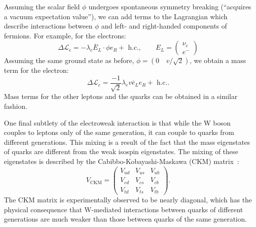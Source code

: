 Assuming the scalar field $\phi$ undergoes spontaneous symmetry breaking (``acquires a vacuum expectation value''), we can add terms to the Lagrangian which describe interactions between $\phi$ and left- and right-handed components of fermions.
For example, for the electrons:
\begin{equation}
\Delta \mathcal L_e = - \lambda_e \bar{E}_L \cdot \phi e_R + \text{ h.c.}, \qquad E_L = \begin{pmatrix} \nu_e \\ e^- \end{pmatrix} 
\end{equation}
Assuming the same ground state as before, $\phi = (0 \quad v/\sqrt{2})$, we obtain a mass term for the electron:
\begin{equation}
    \Delta \mathcal L_e = \frac{-1}{\sqrt{2}} \lambda_e v \bar{e}_L e_R + \text{ h.c.}.
\end{equation}
Mass terms for the other leptons and the quarks can be obtained in a similar fashion.

One final subtlety of the electroweak interaction is that while the W boson couples to leptons only of the same generation, it can couple to quarks from different generations.
This mixing is a result of the fact that the mass eigenstates of quarks are different from the weak isospin eigenstates.
The mixing of these eigenstates is described by the Cabibbo-Kobayashi-Maskawa (CKM) matrix~\cite{Cabibbo:1963yz,Kobayashi:1973fv}:
\begin{equation}
V_{\text{CKM}} = \begin{pmatrix} V_{ud} & V_{us} & V_{ub} \\ V_{cd} & V_{cs} & V_{cb} \\ V_{td} & V_{ts} & V_{tb} \end{pmatrix}.
\end{equation}
The CKM matrix is experimentally observed to be nearly diagonal, which has the physical consequence that W-mediated interactions between quarks of different generations are much weaker than those between quarks of the same generation. 
